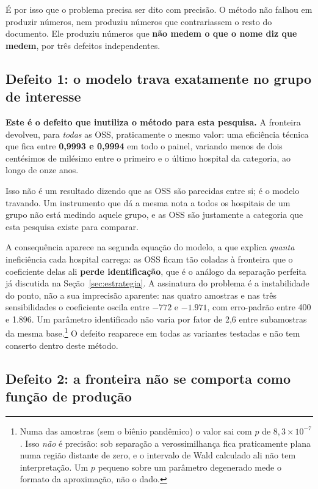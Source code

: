 É por isso que o problema precisa ser dito com precisão. O método não
falhou em produzir números, nem produziu números que contrariassem o
resto do documento. Ele produziu números que \textbf{não medem o que o
nome diz que medem}, por três defeitos independentes.

\subsection*{Defeito 1: o modelo trava exatamente no grupo de interesse}

\textbf{Este é o defeito que inutiliza o método para esta pesquisa.} A
fronteira devolveu, para \emph{todas} as OSS, praticamente o mesmo
valor: uma eficiência técnica que fica entre \textbf{0,9993 e 0,9994} em
todo o painel, variando menos de dois centésimos de milésimo entre o
primeiro e o último hospital da categoria, ao longo de onze anos.

Isso não é um resultado dizendo que as OSS são parecidas entre si; é o
modelo travando. Um instrumento que dá a mesma nota a todos os hospitais
de um grupo não está medindo aquele grupo, e as OSS são justamente a
categoria que esta pesquisa existe para comparar.

A consequência aparece na segunda equação do modelo, a que explica
\emph{quanta} ineficiência cada hospital carrega: as OSS ficam tão
coladas à fronteira que o coeficiente delas ali \textbf{perde
identificação}, que é o análogo da separação perfeita já discutida na
Seção~\ref{sec:estrategia}. A assinatura do problema é a instabilidade
do ponto, não a sua imprecisão aparente: nas quatro amostras e nas três
sensibilidades o coeficiente oscila entre $-772$ e $-1.971$, com
erro-padrão entre 400 e 1.896. Um parâmetro identificado não varia por
fator de 2,6 entre subamostras da mesma base.\footnote{Numa das amostras
(sem o biênio pandêmico) o valor sai com $p$ de $8{,}3\times10^{-7}$.
Isso \emph{não} é precisão: sob separação a verossimilhança fica
praticamente plana numa região distante de zero, e o intervalo de Wald
calculado ali não tem interpretação. Um $p$ pequeno sobre um parâmetro
degenerado mede o formato da aproximação, não o dado.} O defeito
reaparece em todas as variantes testadas e não tem conserto dentro deste
método.

\subsection*{Defeito 2: a fronteira não se comporta como função de produção}

